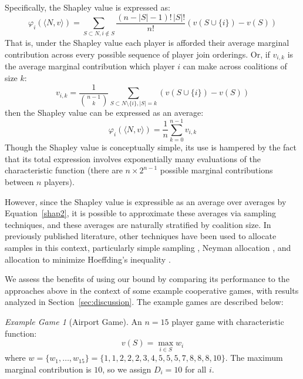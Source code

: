\documentclass[]{interact}
\theoremstyle{plain}%
\theoremstyle{definition}
\theoremstyle{remark}
\newtheorem{example_game}{Example Game}
\begin{document}
Specifically, the Shapley value is expressed as:
\begin{equation}\label{shap1}\varphi_i(\langle N,v\rangle) = \sum_{S\subset N, i\notin S}\frac{(n-|S|-1)!\,|S|!}{n!}(v(S\cup\{i\})-v(S))\end{equation}
That is, under the Shapley value each player is afforded their average marginal contribution across every possible sequence of player join orderings.  
Or, if $v_{i,k}$ is the average marginal contribution which player $i$ can make across coalitions of size $k$:
\begin{equation}
v_{i,k} = \frac{1}{\binom{n-1}{k}}\sum_{S\subset N\setminus \{ i\} , |S|=k} %
(v(S\cup\{i\})-v(S))
\end{equation}
then the Shapley value can be expressed as an average:
\begin{equation}\label{shap2} \varphi_i(\langle N,v\rangle) = \frac{1}{n}\sum_{k=0}^{n-1}v_{i,k} \end{equation}
Though the Shapley value is conceptually simple, its use is hampered by the fact that its total expression involves exponentially many evaluations of the characteristic function (there are $n\times 2^{n-1}$ possible marginal contributions between $n$ players).

However, since the Shapley value is expressible as an average over averages by Equation~\eqref{shap2}, 
it is possible to approximate these averages via sampling techniques, and these averages are naturally stratified by coalition size.
In previously published literature, other techniques have been used to allocate samples in this context, particularly simple sampling \citep{DBLP:journals/cor/CastroGT09}, Neyman allocation \citep{CASTRO2017180,DBLP:journals/tsg/OBrienGR15}, and allocation to minimize Hoeffding's inequality \citep{2013arXiv1306.4265M}.

We assess the benefits of using our bound by comparing its performance to the approaches above in the context of some example cooperative games, with results analyzed in Section~\ref{sec:discussion}.
The example games are described below:

\begin{example_game}[Airport Game]
An $n=15$ player game with characteristic function:
$$v(S)=\max_{i\in S}w_i$$
where
$w=\{w_1,\dots,w_{15}\} %
=\{ 1, 1, 2, 2, 2, 3, 4, 5, 5, 5, 7, 8, 8, 8, 10\}$.
The maximum marginal contribution is $10$, so we assign $D_i=10$ for all $i$.
\end{example_game}
\end{document}
